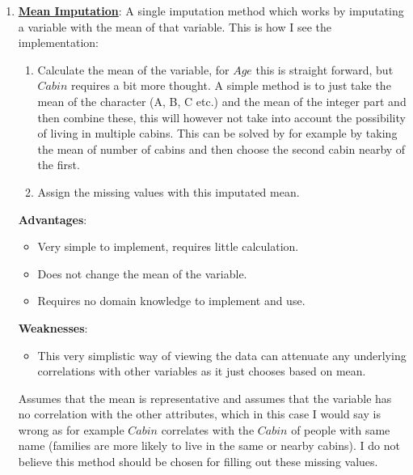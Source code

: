 \documentclass[11pt, english]{../Template/NTNUoving}
\begin{document}
\begin{oppgave}
\begin{enumerate}
        \item \textbf{\href{https://en.wikipedia.org/wiki/Imputation_(statistics)\#Mean_substitution}{Mean Imputation}}: A single imputation method which works by imputating a variable with the mean of that variable.
        This is how I see the implementation:
        \begin{enumerate}
            \item Calculate the mean of the variable, for $Age$ this is straight forward, but $Cabin$ requires a bit more thought. A simple method is to just
            take the mean of the character (A, B, C etc.) and the mean of the integer part and then combine these, this will however not take into account the possibility of living in multiple cabins.
            This can be solved by for example by taking the mean of number of cabins and then choose the second cabin nearby of the first.
            \item Assign the missing values with this imputated mean.
        \end{enumerate}
        \textbf{Advantages}:
        \begin{itemize}
            \item Very simple to implement, requires little calculation.
            \item Does not change the mean of the variable.
            \item Requires no domain knowledge to implement and use.
        \end{itemize}
        \textbf{Weaknesses}:
        \begin{itemize}
            \item This very simplistic way of viewing the data can attenuate any underlying correlations with other variables as it just chooses based on mean.
        \end{itemize}
        Assumes that the mean is representative and assumes that the variable has no correlation with the other attributes, which in this case I would say is wrong
        as for example $Cabin$ correlates with the $Cabin$ of people with same name (families are more likely to live in the same or nearby cabins).
        I do not believe this method should be chosen for filling out these missing values.


\end{enumerate}
\end{oppgave}
\end{document}
